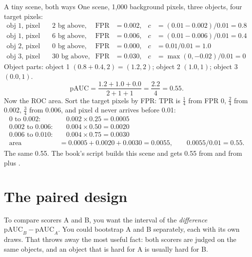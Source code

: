\begin{worked}[label={we:bootstrap:tiny}]{A tiny scene, both ways}
One scene, 1,000 background pixels, three objects, four target pixels\tagA{}:
\begin{align*}
\text{obj 1, pixel a: } & 2 \text{ bg above}, & \mathrm{FPR} &= 0.002, & c &= (0.01 - 0.002)/0.01 = 0.8\\
\text{obj 1, pixel b: } & 6 \text{ bg above}, & \mathrm{FPR} &= 0.006, & c &= (0.01 - 0.006)/0.01 = 0.4\\
\text{obj 2, pixel c: } & 0 \text{ bg above}, & \mathrm{FPR} &= 0.000, & c &= 0.01/0.01 = 1.0\\
\text{obj 3, pixel d: } & 30 \text{ bg above}, & \mathrm{FPR} &= 0.030, & c &= \max(0, -0.02)/0.01 = 0
\end{align*}
Object parts: object 1 $(0.8 + 0.4, 2) = (1.2, 2)$; object 2 $(1.0, 1)$; object 3 $(0.0, 1)$.
\[
\mathrm{pAUC} = \frac{1.2 + 1.0 + 0.0}{2 + 1 + 1} = \frac{2.2}{4} = 0.55.
\]
Now the ROC area. Sort the target pixels by FPR: TPR is $\frac14$ from FPR 0, $\frac24$ from 0.002, $\frac34$ from
0.006, and pixel d never arrives before 0.01:
\begin{align*}
0 \text{ to } 0.002: &\quad 0.002 \times 0.25 = 0.0005\\
0.002 \text{ to } 0.006: &\quad 0.004 \times 0.50 = 0.0020\\
0.006 \text{ to } 0.010: &\quad 0.004 \times 0.75 = 0.0030\\
\text{area} &= 0.0005 + 0.0020 + 0.0030 = 0.0055, \qquad 0.0055 / 0.01 = 0.55.
\end{align*}
The same 0.55. The book's script builds this scene and gets 0.55 from  and from
 plus \tagC{}.
\end{worked}

\section{The paired design}\label{sec:bootstrap:paired}

To compare scorers A and B, you want the interval of the \emph{difference} $\mathrm{pAUC}_B - \mathrm{pAUC}_A$. You could
bootstrap A and B separately, each with its own draws. That throws away the most useful fact: both scorers are judged on
the same objects, and an object that is hard for A is usually hard for B.

